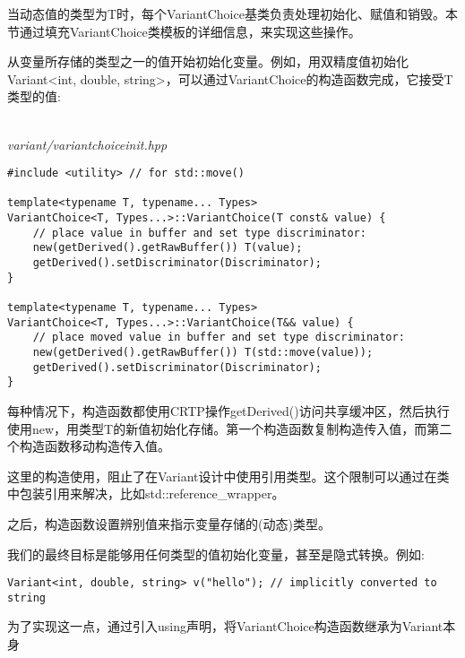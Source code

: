 

当动态值的类型为T时，每个VariantChoice基类负责处理初始化、赋值和销毁。本节通过填充VariantChoice类模板的详细信息，来实现这些操作。



从变量所存储的类型之一的值开始初始化变量。例如，用双精度值初始化Variant<int, double, string>，可以通过VariantChoice的构造函数完成，它接受T类型的值:

\hspace*{\fill} \\ %
\noindent
\textit{variant/variantchoiceinit.hpp}
\begin{lstlisting}[style=styleCXX]
#include <utility> // for std::move()

template<typename T, typename... Types>
VariantChoice<T, Types...>::VariantChoice(T const& value) {
	// place value in buffer and set type discriminator:
	new(getDerived().getRawBuffer()) T(value);
	getDerived().setDiscriminator(Discriminator);
}

template<typename T, typename... Types>
VariantChoice<T, Types...>::VariantChoice(T&& value) {
	// place moved value in buffer and set type discriminator:
	new(getDerived().getRawBuffer()) T(std::move(value));
	getDerived().setDiscriminator(Discriminator);
}
\end{lstlisting}

每种情况下，构造函数都使用CRTP操作getDerived()访问共享缓冲区，然后执行使用new，用类型T的新值初始化存储。第一个构造函数复制构造传入值，而第二个构造函数移动构造传入值。

\begin{tcolorbox}[colback=webgreen!5!white,colframe=webgreen!75!black]
\hspace*{0.75cm}这里的构造使用，阻止了在Variant设计中使用引用类型。这个限制可以通过在类中包装引用来解决，比如std::reference\_wrapper。
\end{tcolorbox}

之后，构造函数设置辨别值来指示变量存储的(动态)类型。

我们的最终目标是能够用任何类型的值初始化变量，甚至是隐式转换。例如:

\begin{lstlisting}[style=styleCXX]
Variant<int, double, string> v("hello"); // implicitly converted to string
\end{lstlisting}

为了实现这一点，通过引入using声明，将VariantChoice构造函数继承为Variant本身

